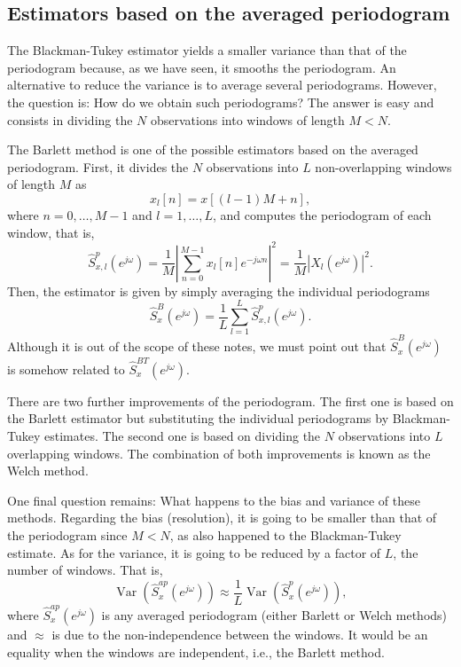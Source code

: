 \subsection{Estimators based on the averaged periodogram}

The Blackman-Tukey estimator yields a smaller variance than that of the periodogram because, as we have seen, it smooths the periodogram. An alternative to reduce the variance is to average several periodograms. However, the question is: How do we obtain such periodograms? The answer is easy and consists in dividing the $N$ observations into windows of length $M < N$. 

The Barlett method is one of the possible estimators based on the averaged periodogram. First, it divides the $N$ observations into $L$ non-overlapping windows of length $M$ as
\begin{equation}
	x_l[n] = x[(l-1) M + n],
\end{equation}
where $n = 0, \ldots, M-1$ and $l = 1, \ldots, L$, and computes the periodogram of each window, that is,
\begin{equation}
\hat{S}_{x,l}^{p}(e^{j \omega}) = \frac{1}{M} \left| \sum_{n = 0}^{M-1} x_l[n] e^{-j \omega n} \right|^2 = \frac{1}{M} \left| X_l(e^{j \omega}) \right|^2.
\end{equation}
Then, the estimator is given by simply averaging the individual periodograms
\begin{equation}
\label{eq:Barlett_estimator}
\hat{S}_{x}^{B}(e^{j \omega}) = \frac{1}{L} \sum_{l = 1}^{L}\hat{S}_{x,l}^{p}(e^{j \omega}).
\end{equation}
Although it is out of the scope of these notes, we must point out that $\hat{S}_{x}^{B}(e^{j \omega})$ is somehow related to $\hat{S}_{x}^{BT}(e^{j \omega})$.

There are two further improvements of the periodogram. The first one is based on the Barlett estimator but substituting the individual periodograms by Blackman-Tukey estimates. The second one is based on dividing the $N$ observations into $L$ overlapping windows. The combination of both improvements is known as the Welch method.

One final question remains: What happens to the bias and variance of these methods. Regarding the bias (resolution), it is going to be smaller than that of the periodogram since $M < N$, as also happened to the Blackman-Tukey estimate. As for the variance, it is going to be reduced by a factor of $L$, the number of windows. That is,
\begin{equation}
\mathop{Var}\left(\hat{S}_x^{ap}(e^{j \omega})\right) \approx \frac{1}{L} \mathop{Var}\left(\hat{S}_x^{p}(e^{j \omega})\right),
\end{equation}
where $\hat{S}_x^{ap}(e^{j \omega})$ is any averaged periodogram (either Barlett or Welch methods) and $\approx$ is due to the non-independence between the windows. It would be an equality when the windows are independent, i.e., the Barlett method.


